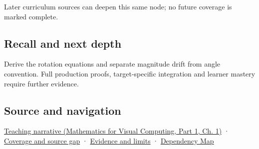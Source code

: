 \hypertarget{appendix-f77eadcc4a93-used-by}{}

Later curriculum sources can deepen this same node; no future coverage is marked complete.

\subsection{Recall and next depth}\label{appendix-f77eadcc4a93-recall-and-next-depth}

\hypertarget{appendix-f77eadcc4a93-recall-and-next-depth}{}

Derive the rotation equations and separate magnitude drift from angle convention. Full production proofs, target-specific integration and learner mastery require further evidence.

\subsection{Source and navigation}\label{appendix-f77eadcc4a93-source-and-navigation}

\hypertarget{appendix-f77eadcc4a93-source-and-navigation}{}

\href{../02-Mathematics-for-Visual-Computing-P01/main.pdf\#nameddest=01-foundations-i-ch017-rotation-first-becomes-understandable-in-a-plane}{Teaching narrative (Mathematics for Visual Computing, Part 1, Ch. 1)} · \hyperref[appendix-fd090d982a15-phase-6---parts-501-600]{Coverage and source gap} · \hyperref[appendix-a103e7846d21-phase-6---source-analysis-and-verification]{Evidence and limits} · \hyperref[appendix-4ad47bdd269a]{Dependency Map}

